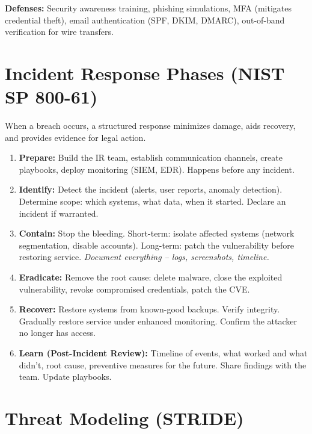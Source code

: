 \documentclass[11pt, letterpaper]{article}
\begin{document}
\textbf{Defenses:} Security awareness training, phishing simulations, MFA (mitigates credential theft), email authentication (SPF, DKIM, DMARC), out-of-band verification for wire transfers.

\section*{Incident Response Phases (NIST SP 800-61)}

When a breach occurs, a structured response minimizes damage, aids recovery, and provides evidence for legal action.

\begin{tcolorbox}[colback=part2bg, colframe=sectiongreen,
  title={\bfseries The 6 Phases of Incident Response}, arc=3pt, boxrule=1pt]
\begin{enumerate}[leftmargin=*, noitemsep]
  \item \textbf{Prepare:} Build the IR team, establish communication channels, create playbooks, deploy monitoring (SIEM, EDR). Happens before any incident.
  \item \textbf{Identify:} Detect the incident (alerts, user reports, anomaly detection). Determine scope: which systems, what data, when it started. Declare an incident if warranted.
  \item \textbf{Contain:} Stop the bleeding. Short-term: isolate affected systems (network segmentation, disable accounts). Long-term: patch the vulnerability before restoring service. \textit{Document everything -- logs, screenshots, timeline.}
  \item \textbf{Eradicate:} Remove the root cause: delete malware, close the exploited vulnerability, revoke compromised credentials, patch the CVE.
  \item \textbf{Recover:} Restore systems from known-good backups. Verify integrity. Gradually restore service under enhanced monitoring. Confirm the attacker no longer has access.
  \item \textbf{Learn (Post-Incident Review):} Timeline of events, what worked and what didn't, root cause, preventive measures for the future. Share findings with the team. Update playbooks.
\end{enumerate}
\end{tcolorbox}

\section*{Threat Modeling (STRIDE)}
\end{document}
